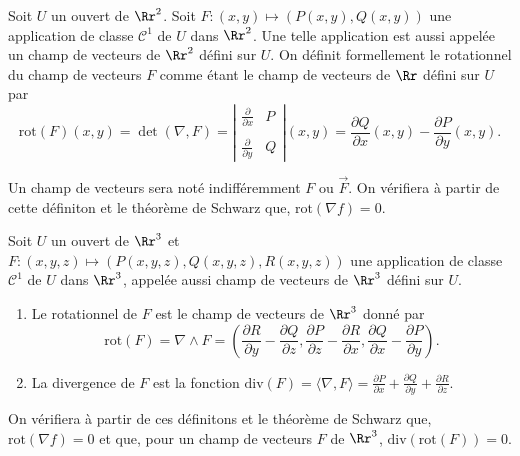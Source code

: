 \documentclass[11pt, class=report,crop=false]{standalone}
\begin{document}
\vskip6mm

\begin{definition}Soit $U$ un ouvert de $\Rr^2$. Soit $F:(x,y)\mapsto \left(P(x,y),Q(x,y)\right)$ une application de classe $\mathscr{C}^1$ de $U$ dans $\Rr^2$. Une telle application est aussi appelée un champ de vecteurs de $\Rr^2$ défini sur $U$. On définit formellement le rotationnel du champ de vecteurs $F$ comme étant le champ de vecteurs de $\Rr$ défini sur $U$ par
$$\mathrm{rot}(F)(x,y)=\det (\nabla ,F)=\left|\begin{array}{cc}\frac{\partial}{\partial x}&P\\ \\ \frac{\partial}{\partial y}&Q
\end{array}\right|(x,y)=\frac{\partial Q}{\partial x}(x,y)-\frac{\partial P}{\partial y}(x,y).$$
\end{definition}

\vskip4mm

\noindent Un champ de vecteurs sera noté indifféremment $F$ ou $\overrightarrow{F}$. On vérifiera à partir de cette définiton et le théorème de Schwarz que, $\mbox{rot}(\nabla f)=0$.

\vskip6mm

\begin{definition}Soit $U$ un ouvert de $\Rr^3$ et $F:(x,y,z)\mapsto \left(P(x,y,z),Q(x,y,z),R(x,y,z)\right)$ une application de classe $\mathscr{C}^1$ de $U$ dans $\Rr^3$, appelée aussi champ de vecteurs de $\Rr^3$ défini sur $U$.
\begin{enumerate}
\item Le rotationnel de $F$ est le champ de vecteurs de $\Rr^3$ donné par
$$\mathrm{rot}(F)=\nabla \wedge F=\left(\frac{\partial R}{\partial y}-\frac{\partial Q}{\partial z},\frac{\partial P}{\partial z}-\frac{\partial R}{\partial x},\frac{\partial Q}{\partial x}-\frac{\partial P}{\partial y}\right).$$
\item La divergence de $F$ est la fonction $\displaystyle \mathrm{div}(F)=\langle \nabla ,F\rangle =\frac{\partial P}{\partial x}+\frac{\partial Q}{\partial y}+\frac{\partial R}{\partial z}$.
\end{enumerate}
\end{definition}

\vskip4mm

\noindent On vérifiera à partir de ces définitons et le théorème de Schwarz que, $\mbox{rot}(\nabla f)=0$ et que, pour un champ de vecteurs $F$ de $\Rr^3$, $\mathrm{div}(\mathrm{rot}(F))=0$.
\end{document}
